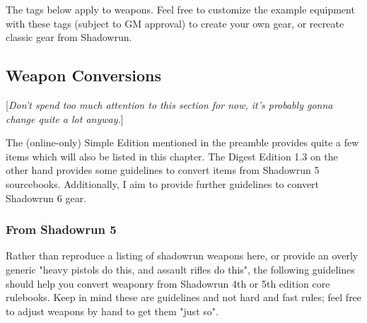 The tags below apply to weapons. Feel free to customize the example equipment with these tags (subject to GM approval) to create your own gear, or recreate classic gear from Shadowrun.



\subsection{Weapon Conversions}

[\textit{Don't spend too much attention to this section for now, it's probably gonna change quite a lot anyway.}]

The (online-only) Simple Edition mentioned in the preamble provides quite a few items which will also be listed in this chapter. The Digest Edition 1.3 on the other hand provides some guidelines to convert items from Shadowrun 5 sourcebooks. Additionally, I aim to provide further guidelines to convert Shadowrun 6 gear.

\subsubsection{From Shadowrun 5}
Rather than reproduce a listing of shadowrun weapons here, or provide an overly generic "heavy pistols do this, and assault rifles do this", the following guidelines should help you convert weaponry from Shadowrun 4th or 5th edition core rulebooks. Keep in mind these are guidelines and not hard and fast rules; feel free to adjust weapons by hand to get them "just so".


